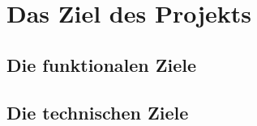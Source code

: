 \chapter{Das Ziel des Projekts}
\label{cha:Zielsetzung}
\section{Die funktionalen Ziele}

\section{Die technischen Ziele}

